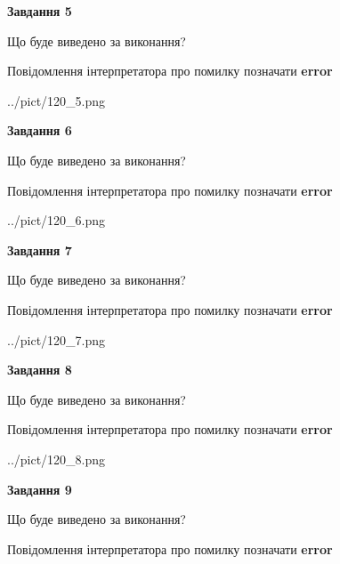 \documentclass[11pt, ukrainian]{article}
\begin{document}
{\begin {large}
{\begin {center}\textbf{Завдання 5}\end {center}}\par
Що буде виведено за виконання? \par
Повідомлення інтерпретатора про помилку позначати \textbf{error}

\begin{center}
	{../pict/120_5.png}
\end{center}
\newpage

{\begin {center}\textbf{Завдання 6}\end {center}}\par
Що буде виведено за виконання? \par
Повідомлення інтерпретатора про помилку позначати \textbf{error}

\begin{center}
	{../pict/120_6.png}
\end{center}
\newpage

{\begin {center}\textbf{Завдання 7}\end {center}}\par
Що буде виведено за виконання? \par
Повідомлення інтерпретатора про помилку позначати \textbf{error}

\begin{center}
	{../pict/120_7.png}
\end{center}
\newpage

{\begin {center}\textbf{Завдання 8}\end {center}}\par
Що буде виведено за виконання? \par
Повідомлення інтерпретатора про помилку позначати \textbf{error}

\begin{center}
	{../pict/120_8.png}
\end{center}
\newpage

{\begin {center}\textbf{Завдання 9}\end {center}}\par
Що буде виведено за виконання? \par
Повідомлення інтерпретатора про помилку позначати \textbf{error}


\end{large}}
\end{document}
